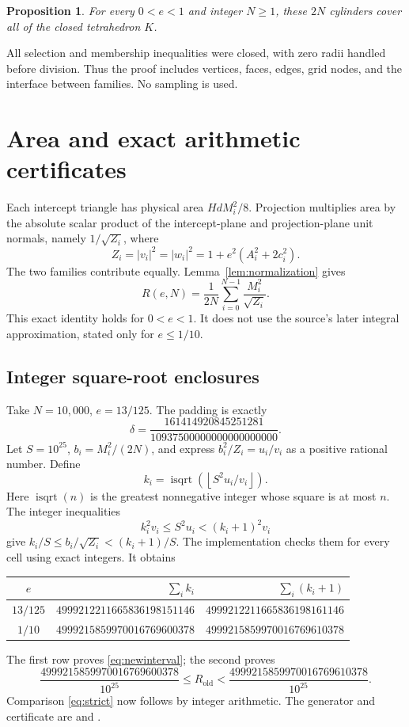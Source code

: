 \documentclass[11pt]{article}
\newtheorem{proposition}[theorem]{Proposition}
\DeclareMathOperator{\isqrt}{isqrt}
\begin{document}
\begin{proposition}\label{prop:coverage}
For every \(0<e<1\) and integer \(N\ge1\), these \(2N\) cylinders cover
all of the closed tetrahedron \(K\).
\end{proposition}
All selection and membership inequalities were closed, with zero radii
handled before division. Thus the proof includes vertices, faces, edges,
grid nodes, and the interface between families. No sampling is used.

\section{Area and exact arithmetic certificates}
Each intercept triangle has physical area \(HdM_i^2/8\).
Projection multiplies area by the absolute scalar product of the
intercept-plane and projection-plane unit normals, namely
\(1/\sqrt{Z_i}\), where
\[
 Z_i=|v_i|^2=|w_i|^2=1+e^2(A_i^2+2c_i^2).
\]
The two families contribute equally. Lemma~\ref{lem:normalization} gives
\begin{equation}\label{eq:area}
 R(e,N)=\frac1{2N}\sum_{i=0}^{N-1}\frac{M_i^2}{\sqrt{Z_i}}.
\end{equation}
This exact identity holds for \(0<e<1\). It does not use the source's
later integral approximation, stated only for \(e\le1/10\).

\subsection{Integer square-root enclosures}
Take \(N=10{,}000\), \(e=13/125\). The padding is exactly
\[
 \delta=\frac{161414920845251281}{10937500000000000000000}.
\]
Let \(S=10^{25}\), \(b_i=M_i^2/(2N)\), and express
\(b_i^2/Z_i=u_i/v_i\) as a positive rational number. Define
\[
 k_i=\isqrt\left(\left\lfloor S^2u_i/v_i\right\rfloor\right).
\]
Here \(\isqrt(n)\) is the greatest nonnegative integer whose square is
at most \(n\). The integer inequalities
\[
 k_i^2v_i\le S^2u_i<(k_i+1)^2v_i
\]
give \(k_i/S\le b_i/\sqrt{Z_i}<(k_i+1)/S\).
The implementation checks them for every cell using exact integers.
It obtains
\begin{center}\small
\begin{tabular}{@{}crr@{}}
\toprule
\(e\) & \(\sum_i k_i\) & \(\sum_i(k_i+1)\)\\
\midrule
\(13/125\) & \(4999212211665836198151146\) & \(4999212211665836198161146\)\\
\(1/10\) & \(4999215859970016769600378\) & \(4999215859970016769610378\)\\
\bottomrule
\end{tabular}
\end{center}
The first row proves \eqref{eq:newinterval}; the second proves
\begin{equation}\label{eq:oldinterval}
 \frac{4999215859970016769600378}{10^{25}}\le R_{\mathrm{old}}<
 \frac{4999215859970016769610378}{10^{25}}.
\end{equation}
Comparison \eqref{eq:strict} now follows by integer arithmetic.
The generator and certificate are 
and .
\end{document}
